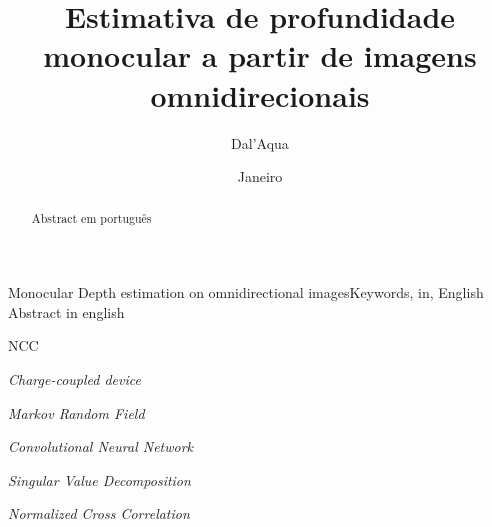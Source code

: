 \documentclass[cic,tc]{iiufrgs}
\title{Estimativa de profundidade monocular a partir de imagens omnidirecionais}
\author{Dal'Aqua}{Lorenzo Pezzi}
\date{Janeiro}{11, 2018}
\begin{document}
\maketitle





\begin{abstract}
    Abstract em português
\end{abstract}

\begin{englishabstract}{Monocular Depth estimation on omnidirectional images}{Keywords, in, English}
    Abstract in english
\end{englishabstract}

\listoffigures

\listoftables

\begin{listofabbrv}{NCC}
	\item[CCD] \textit{Charge-coupled device}
    \item[MRF] \textit{Markov Random Field}
    \item[CNN] \textit{Convolutional Neural Network}
    \item[SVD] \textit{Singular Value Decomposition}
    \item[NCC] \textit{Normalized Cross Correlation}
\end{listofabbrv}

\end{document}
